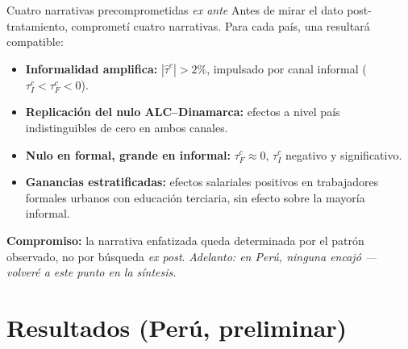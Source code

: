 \documentclass[9pt, aspectratio=169]{beamer}
\begin{document}
\begin{frame}{Cuatro narrativas precomprometidas \emph{ex ante}}
  Antes de mirar el dato post-tratamiento, comprometí cuatro narrativas. Para cada país, una resultará compatible:
  \vfill
  \small
  \begin{itemize}
    \setlength\itemsep{0.45em}
    \item[\textbf{A.}] \textbf{Informalidad amplifica:} $|\hat\tau^c| > 2\%$, impulsado por canal informal ($\tau_I^c < \tau_F^c < 0$).
    \item[\textbf{B.}] \textbf{Replicación del nulo ALC--Dinamarca:} efectos a nivel país indistinguibles de cero en ambos canales.
    \item[\textbf{C.}] \textbf{Nulo en formal, grande en informal:} $\tau_F^c \approx 0$, $\tau_I^c$ negativo y significativo.
    \item[\textbf{D.}] \textbf{Ganancias estratificadas:} efectos salariales positivos en trabajadores formales urbanos con educación terciaria, sin efecto sobre la mayoría informal.
  \end{itemize}
  \vfill
  \normalsize
  \textbf{Compromiso:} la narrativa enfatizada queda determinada por el patrón observado, no por búsqueda \emph{ex post}. \emph{Adelanto: en Perú, ninguna encajó --- volveré a este punto en la síntesis.}
\end{frame}

\section{Resultados (Perú, preliminar)}
\end{document}
